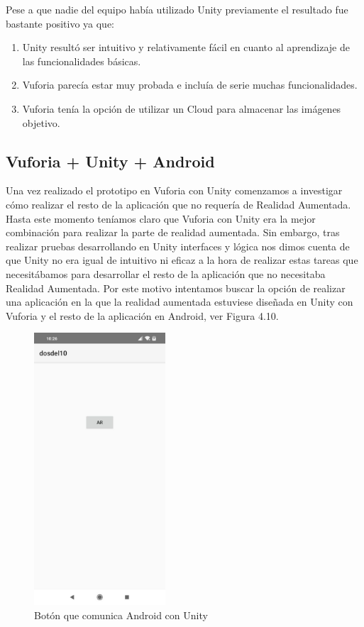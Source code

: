 Pese a que nadie del equipo había utilizado Unity previamente el resultado fue bastante positivo ya que:
\begin{enumerate}
    \item Unity resultó ser intuitivo y relativamente fácil en cuanto al aprendizaje de las funcionalidades básicas.
    \item Vuforia parecía estar muy probada e incluía de serie muchas funcionalidades.
    \item Vuforia tenía la opción de utilizar un Cloud para almacenar las imágenes objetivo.
\end{enumerate}


\subsection{Vuforia + Unity + Android} 
\label{makereference4.1.5}

Una vez realizado el prototipo en Vuforia con Unity comenzamos a investigar cómo realizar el resto de la aplicación que no requería de Realidad Aumentada.
Hasta este momento teníamos claro que Vuforia con Unity era la mejor combinación para realizar la parte de realidad aumentada. Sin embargo, tras realizar pruebas desarrollando en Unity interfaces y lógica nos dimos cuenta de que Unity no era igual de intuitivo ni eficaz a la hora de realizar estas tareas que necesitábamos para desarrollar el resto de la aplicación que no necesitaba Realidad Aumentada.
Por este motivo intentamos buscar la opción de realizar una aplicación en la que la realidad aumentada estuviese diseñada en Unity con Vuforia y el resto de la aplicación en Android, ver Figura 4.10.

\begin{figure}[H]
    \centering
    \includegraphics[height=4in]{figures/androidUnityVuforia.jpg}
    \caption{Botón que comunica Android con Unity}
\end{figure}

